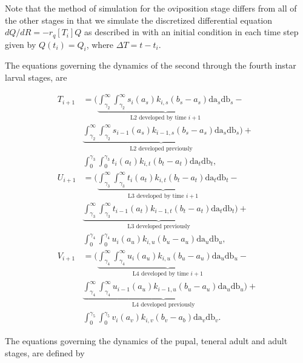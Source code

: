 \documentclass[12pt]{article}
\begin{document}
Note that the method of simulation for the oviposition stage differs from all of the other stages in that we simulate the discretized differential equation $dQ/dR = -r_q[T_i]Q$ as described in \citet{Regniere2012a} with an initial condition in each time step given by $Q(t_i) = Q_i$, where $\Delta T = t - t_i$.

The equations governing the dynamics of the second through the fourth instar larval stages, are

\begin{align*}
T_{i+1} &= \bigg(\underbrace{\int_{\gamma_2}^{\infty}\int_{\gamma_2}^{\infty} s_i(a_s)k_{i,s}(b_s - a_s)\text{da}_s\text{db}_s}_{\text{L2 developed by time $i+1$}} -\\
& \underbrace{\int_{\gamma_2}^{\infty}\int_{\gamma_2}^{\infty} s_{i-1}(a_s)k_{i-1,s}(b_s - a_s)\text{da}_s\text{db}_s}_{\text{L2 developed previously}}\bigg)+\\
& \int_0^{\gamma_3} \int_0^{\gamma_3} t_i(a_t)k_{i,t}(b_t - a_t)\text{da}_t\text{db}_t, \tag{eqn A4.1d}\\
U_{i+1} &= \bigg(\underbrace{\int_{\gamma_3}^{\infty}\int_{\gamma_3}^{\infty} t_i(a_t)k_{i,t}(b_t - a_t)\text{da}_t\text{db}_t}_{\text{L3 developed by time $i+1$}} -\\
& \underbrace{\int_{\gamma_3}^{\infty}\int_{\gamma_3}^{\infty} t_{i-1}(a_t)k_{i-1,t}(b_t - a_t)\text{da}_t\text{db}_t}_{\text{L3 developed previously}}\bigg)+\\
& \int_0^{\gamma_4}\int_0^{\gamma_4} u_i(a_u)k_{i,u}(b_u - a_u)\text{da}_u\text{db}_u, \tag{eqn A4.1e}\\
V_{i+1} &= \bigg(\underbrace{\int_{\gamma_4}^{\infty}\int_{\gamma_4}^{\infty} u_i(a_u)k_{i,u}(b_u - a_u)\text{da}_u\text{db}_u}_{\text{L4 developed by time $i+1$}} -\\
& \underbrace{\int_{\gamma_4}^{\infty}\int_{\gamma_4}^{\infty} u_{i-1}(a_u)k_{i-1,u}(b_u - a_u)\text{da}_u\text{db}_u}_{\text{L4 developed previously}}\bigg)+\\
& \int_0^{\gamma_5}\int_0^{\gamma_5} v_i(a_v)k_{i,v}(b_v - a_b)\text{da}_v\text{db}_v. \tag{eqn A4.1f}
\end{align*}

The equations governing the dynamics of the pupal, teneral adult and adult stages, are defined by 
\end{document}
